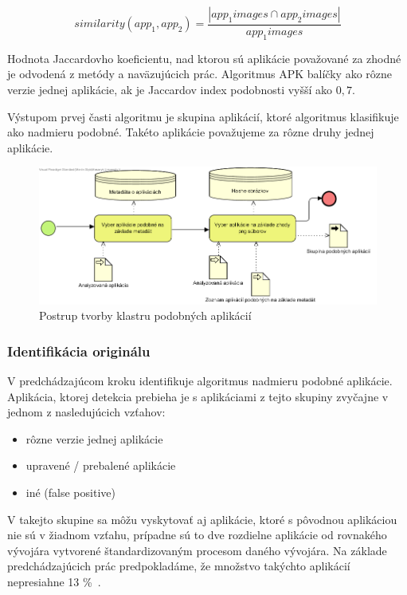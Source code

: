 \[ similarity(app_1, app_2) = \frac{|app_{1}images \cap app_{2}images|} { app_{1}images} \]

Hodnota Jaccardovho koeficientu, nad ktorou sú aplikácie považované za zhodné je odvodená z metódy  a naväzujúcich prác. Algoritmus APK balíčky ako rôzne verzie jednej aplikácie, ak je Jaccardov index podobnosti vyšší ako $0,7$.

Výstupom prvej časti algoritmu je skupina aplikácií, ktoré algoritmus klasifikuje ako nadmieru podobné. Takéto aplikácie považujeme za rôzne druhy jednej aplikácie.

\begin{figure}[htb]
  \begin{center}
    \includegraphics[width=130mm]{images/detection-cluster.png}
  \end{center}
  \caption{Postrup tvorby klastru podobných aplikácií}
  \label{fig:detectionClustering}
\end{figure}
\subsubsection{\textbf{Identifikácia originálu}} 
V predchádzajúcom kroku identifikuje algoritmus nadmieru podobné aplikácie. Aplikácia, ktorej detekcia prebieha je s aplikáciami z tejto skupiny zvyčajne v jednom z nasledujúcich vzťahov:
\begin{itemize}
	\item rôzne verzie jednej aplikácie
	\item upravené / prebalené aplikácie
	\item iné (false positive)
\end{itemize}
V takejto skupine sa môžu vyskytovať aj aplikácie, ktoré s pôvodnou aplikáciou nie sú v žiadnom vzťahu, prípadne sú to dve rozdielne aplikácie od rovnakého vývojára vytvorené štandardizovaným procesom daného vývojára. Na základe predchádzajúcich prác predpokladáme, že množstvo takýchto aplikácií nepresiahne 13 \%~\cite{Zhou2012}.

